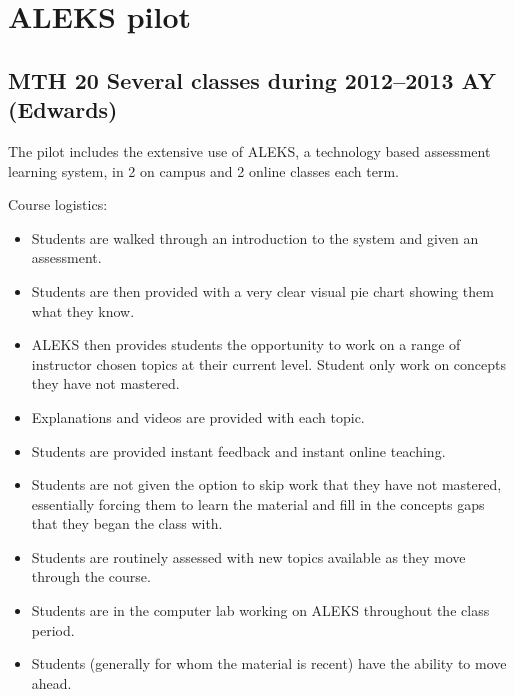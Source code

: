 \chapter{ALEKS pilot}\label{app:sec:aleks}
\section[MTH 20]{MTH 20 Several classes during 2012--2013 AY (Edwards)}

The pilot includes the extensive use of ALEKS, a technology based assessment learning system,  in 2 on campus and 2 online classes each term.  

Course logistics: 
\begin{itemize}
    \item Students are walked through an introduction to the system and given
      an assessment.
    \item Students are then provided with a very clear visual pie chart showing
      them what they know.
    \item ALEKS then provides students the opportunity to work on a range of
      instructor chosen topics at their current level.  Student only work on concepts they have not mastered.
    \item Explanations and videos are provided with each topic.
    \item Students are provided instant feedback and instant online teaching.
    \item Students are not given the option to skip work that they have not
      mastered, essentially forcing them to learn the material and 
	fill in the concepts gaps that they began the class with.
    \item Students are routinely assessed with new topics available as they
      move through the course.
    \item Students are in the computer lab working on ALEKS throughout the
      class period.
    \item Students (generally for whom the material is recent) have the
      ability to move ahead.  
\end{itemize}

